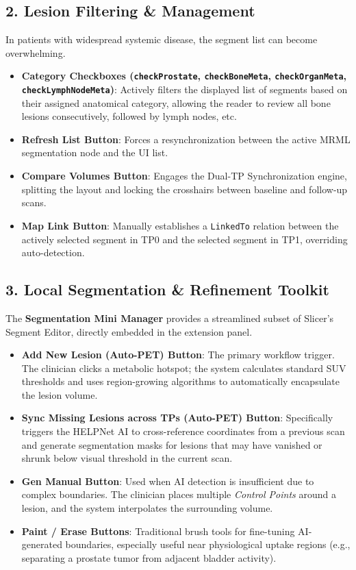 \documentclass[a4paper,10pt]{article}
\begin{document}
\subsection{2. Lesion Filtering \& Management}
In patients with widespread systemic disease, the segment list can become overwhelming.
\begin{itemize}
    \item \textbf{Category Checkboxes (\texttt{checkProstate}, \texttt{checkBoneMeta}, \texttt{checkOrganMeta}, \texttt{checkLymphNodeMeta})}: Actively filters the displayed list of segments based on their assigned anatomical category, allowing the reader to review all bone lesions consecutively, followed by lymph nodes, etc.
    \item \textbf{Refresh List Button}: Forces a resynchronization between the active MRML segmentation node and the UI list.
    \item \textbf{Compare Volumes Button}: Engages the Dual-TP Synchronization engine, splitting the layout and locking the crosshairs between baseline and follow-up scans.
    \item \textbf{Map Link Button}: Manually establishes a \texttt{LinkedTo} relation between the actively selected segment in TP0 and the selected segment in TP1, overriding auto-detection.
\end{itemize}

\subsection{3. Local Segmentation \& Refinement Toolkit}
The \textbf{Segmentation Mini Manager} provides a streamlined subset of Slicer's Segment Editor, directly embedded in the extension panel.
\begin{itemize}
    \item \textbf{Add New Lesion (Auto-PET) Button}: The primary workflow trigger. The clinician clicks a metabolic hotspot; the system calculates standard SUV thresholds and uses region-growing algorithms to automatically encapsulate the lesion volume.
    \item \textbf{Sync Missing Lesions across TPs (Auto-PET) Button}: Specifically triggers the HELPNet AI to cross-reference coordinates from a previous scan and generate segmentation masks for lesions that may have vanished or shrunk below visual threshold in the current scan.
    \item \textbf{Gen Manual Button}: Used when AI detection is insufficient due to complex boundaries. The clinician places multiple \textit{Control Points} around a lesion, and the system interpolates the surrounding volume.
    \item \textbf{Paint / Erase Buttons}: Traditional brush tools for fine-tuning AI-generated boundaries, especially useful near physiological uptake regions (e.g., separating a prostate tumor from adjacent bladder activity).
\end{itemize}
\end{document}
